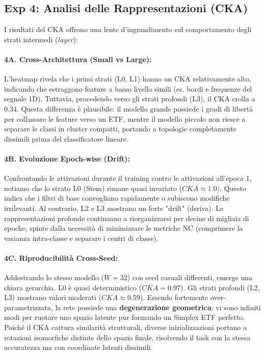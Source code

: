 \documentclass[10pt,twocolumn,letterpaper]{article}
\begin{document}
\subsection{Exp 4: Analisi delle Rappresentazioni (CKA)}
I risultati del CKA offrono una lente d'ingrandimento sul comportamento degli strati intermedi (\textit{layer}):

\paragraph{4A. Cross-Architettura (Small vs Large):} 
L'heatmap rivela che i primi strati (L0, L1) hanno un CKA relativamente alto, indicando che estraggono feature a basso livello simili (es. bordi e frequenze del segnale 1D). Tuttavia, procedendo verso gli strati profondi (L3), il CKA crolla a $0.34$. Questa differenza è plausibile: il modello grande possiede i gradi di libertà per collassare le feature verso un ETF, mentre il modello piccolo non riesce a separare le classi in cluster compatti, portando a topologie completamente dissimili prima del classificatore lineare.

\paragraph{4B. Evoluzione Epoch-wise (Drift):}
Confrontando le attivazioni durante il training contro le attivazioni all'epoca 1, notiamo che lo strato L0 (Stem) rimane quasi invariato ($CKA \approx 1.0$). Questo indica che i filtri di base convogliano rapidamente o subiscono modifiche irrilevanti. Al contrario, L2 e L3 mostrano un forte "drift" (deriva). Le rappresentazioni profonde continuano a riorganizzarsi per decine di migliaia di epoche, spinte dalla necessità di minimizzare le metriche NC (comprimere la varianza intra-classe e separare i centri di classe).

\paragraph{4C. Riproducibilità Cross-Seed:}
Addestrando lo stesso modello ($W=32$) con seed casuali differenti, emerge una chiara gerarchia. L0 è quasi deterministico ($CKA = 0.97$). Gli strati profondi (L2, L3) mostrano valori moderati ($CKA \approx 0.59$). Essendo fortemente over-parametrizzata, la rete possiede una \textbf{degenerazione geometrica}: vi sono infiniti modi per ruotare uno spazio latente pur formando un Simplex ETF perfetto. Poiché il CKA cattura similarità strutturali, diverse inizializzazioni portano a rotazioni isomorfiche distinte dello spazio finale, risolvendo il task con la stessa accuratezza ma con coordinate latenti dissimili.
\end{document}
